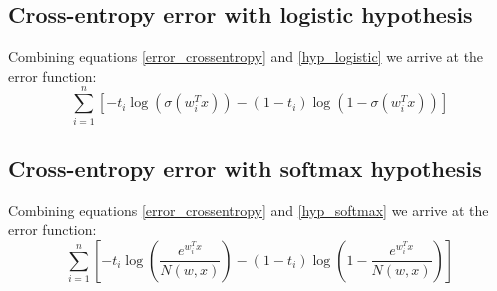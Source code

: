\documentclass[12pt, a4paper]{article}
\numberwithin{equation}{section}
\begin{document}
\subsection{Cross-entropy error with logistic hypothesis}
Combining equations \ref{error_crossentropy} and \ref{hyp_logistic} we arrive at the error function:
\begin{equation}
\sum_{i=1}^n\left[-t_i\log(\sigma(w_i^T x))-(1-t_i)\log(1-\sigma(w_i^T x))\right]
\end{equation}

\subsection{Cross-entropy error with softmax hypothesis}
Combining equations \ref{error_crossentropy} and \ref{hyp_softmax} we arrive at the error function:
\begin{equation}
\sum_{i=1}^n\left[-t_i\log\left(\frac{e^{w_i^T x}}{N(w,x)}\right)-(1-t_i)\log\left(1-\frac{e^{w_i^T x}}{N(w,x)}\right)\right]
\end{equation}
\end{document}
